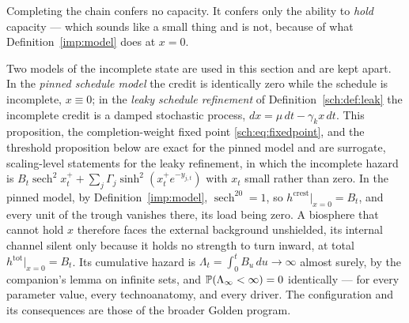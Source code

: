 Completing the chain confers no capacity. It confers only the ability to
\emph{hold} capacity --- which sounds like a small thing and is not,
because of what Definition~\ref{imp:model} does at $x=0$.

\begin{proposition}\label{sch:prop:gating}
Two models of the incomplete state are used in this section and are
kept apart. In the \emph{pinned schedule model} the credit is
identically zero while the schedule is incomplete, $x\equiv0$; in the
\emph{leaky schedule refinement} of Definition~\ref{sch:def:leak} the
incomplete credit is a damped stochastic process, $dx=\mu\,dt-\gamma_kx\,dt$.
This proposition, the completion-weight fixed point
\eqref{sch:eq:fixedpoint}, and the threshold proposition below are
exact for the pinned model and are surrogate, scaling-level statements
for the leaky refinement, in which the incomplete hazard is
$B_t\operatorname{sech}^2x_t^++\sum_j\Gamma_j\sinh^2(x_t^+e^{-y_{j,t}})$ with $x_t$ small rather than zero. In the
pinned model, by Definition~\ref{imp:model},
$\operatorname{sech}^20=1$, so $h^{\mathrm{crest}}\big|_{x=0}=B_t$, and every unit of the
trough vanishes there, its load being zero. A biosphere
that cannot hold $x$ therefore faces the external background unshielded,
its internal channel silent only because it holds no strength to turn
inward, at total
$h^{\mathrm{tot}}\big|_{x=0}=B_t$. Its cumulative hazard is
$\Lambda_t=\int_0^tB_u\,du\to\infty$ almost surely, by the companion's lemma on infinite sets, and
$\mathbb{P}(\Lambda_\infty<\infty)=0$ identically --- for every parameter
value, every technoanatomy, and every driver. The configuration and its
consequences are those of the broader Golden program.
\end{proposition}

